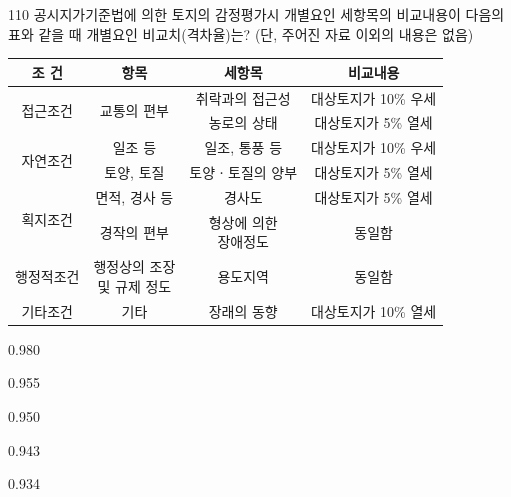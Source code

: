 \begin{question}{110}
공시지가기준법에 의한 토지의 감정평가시 개별요인 세항목의 비교내용이 다음의 표와 같을 때 개별요인 비교치(격차율)는? (단, 주어진 자료 이외의 내용은 없음)
\par
{\small\centering
\begin{tabular}{|c|c|c|c|}\hline
조 건 & 항목 & 세항목 & 비교내용\\\hline
\multirow{2}{*}{접근조건} & \multirow{2}{*}{교통의 편부} & 취락과의 접근성 & 대상토지가 10\% 우세\\\cline{3-4}
 & & 농로의 상태 & 대상토지가 5\% 열세\\\hline
\multirow{2}{*}{자연조건} & 일조 등 & 일조, 통풍 등 & 대상토지가 10\% 우세\\\cline{2-4}
 & 토양, 토질 & 토양ㆍ토질의 양부 & 대상토지가 5\% 열세\\\hline
\multirow{2}{*}{획지조건} & 면적, 경사 등 & 경사도 & 대상토지가 5\% 열세\\\cline{2-4}
 & 경작의 편부 & \makecell{형상에 의한\\장애정도} & 동일함\\\hline
행정적조건 & \makecell{행정상의 조장\\및 규제 정도} & 용도지역 & 동일함\\\hline
기타조건 & 기타 & 장래의 동향 & 대상토지가 10\% 열세\\\hline
\end{tabular}\par}
\begin{choices}
  \item 0.980
  \item 0.955
  \item 0.950
  \item 0.943
  \item 0.934
\end{choices}
\end{question}
